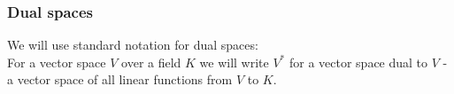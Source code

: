 \documentclass[a4paper, 12pt]{report}
\begin{document}
\subsubsection{Dual spaces}
We will use standard notation for dual spaces: \\ 
For a vector space $V$ over a field $K$ we will write $V^*$ for a vector space dual to $V$ - 
a vector space of all linear functions from $V$ to $K$. 
\end{document}
